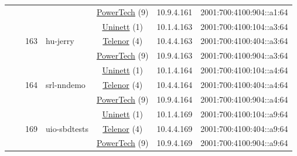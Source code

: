 \begin{small}
\begin{center}
\begin{longtable}{|c|c|c|c|c|c|c|c|}
  &  &  &  & \multicolumn{2}{|c|}{\tiny{\href{http://www.powertech.no}{PowerTech} (9)}} & \tiny{10.9.4.161} & \tiny{2001:700:4100:904::a1:64} \\* \cline{3-3}\cline{4-4}\cline{5-5}\cline{6-6}\cline{7-7}\cline{8-8}
  &  & \multirow{3}{*}{\tiny{163}} & \multicolumn{1}{|l|}{\multirow{3}{*}{\tiny{hu-jerry}}} & \multicolumn{2}{|c|}{\tiny{\href{https://www.uninett.no}{Uninett} (1)}} & \tiny{10.1.4.163} & \tiny{2001:700:4100:104::a3:64} \\* \cline{5-5}\cline{6-6}\cline{7-7}\cline{8-8}
  &  &  &  & \multicolumn{2}{|c|}{\tiny{\href{https://www.telenor.no}{Telenor} (4)}} & \tiny{10.4.4.163} & \tiny{2001:700:4100:404::a3:64} \\* \cline{5-5}\cline{6-6}\cline{7-7}\cline{8-8}
  &  &  &  & \multicolumn{2}{|c|}{\tiny{\href{http://www.powertech.no}{PowerTech} (9)}} & \tiny{10.9.4.163} & \tiny{2001:700:4100:904::a3:64} \\* \cline{3-3}\cline{4-4}\cline{5-5}\cline{6-6}\cline{7-7}\cline{8-8}
  &  & \multirow{3}{*}{\tiny{164}} & \multicolumn{1}{|l|}{\multirow{3}{*}{\tiny{srl-nndemo}}} & \multicolumn{2}{|c|}{\tiny{\href{https://www.uninett.no}{Uninett} (1)}} & \tiny{10.1.4.164} & \tiny{2001:700:4100:104::a4:64} \\* \cline{5-5}\cline{6-6}\cline{7-7}\cline{8-8}
  &  &  &  & \multicolumn{2}{|c|}{\tiny{\href{https://www.telenor.no}{Telenor} (4)}} & \tiny{10.4.4.164} & \tiny{2001:700:4100:404::a4:64} \\* \cline{5-5}\cline{6-6}\cline{7-7}\cline{8-8}
  &  &  &  & \multicolumn{2}{|c|}{\tiny{\href{http://www.powertech.no}{PowerTech} (9)}} & \tiny{10.9.4.164} & \tiny{2001:700:4100:904::a4:64} \\* \cline{3-3}\cline{4-4}\cline{5-5}\cline{6-6}\cline{7-7}\cline{8-8}
  &  & \multirow{3}{*}{\tiny{169}} & \multicolumn{1}{|l|}{\multirow{3}{*}{\tiny{uio-sbdtests}}} & \multicolumn{2}{|c|}{\tiny{\href{https://www.uninett.no}{Uninett} (1)}} & \tiny{10.1.4.169} & \tiny{2001:700:4100:104::a9:64} \\* \cline{5-5}\cline{6-6}\cline{7-7}\cline{8-8}
  &  &  &  & \multicolumn{2}{|c|}{\tiny{\href{https://www.telenor.no}{Telenor} (4)}} & \tiny{10.4.4.169} & \tiny{2001:700:4100:404::a9:64} \\* \cline{5-5}\cline{6-6}\cline{7-7}\cline{8-8}
  &  &  &  & \multicolumn{2}{|c|}{\tiny{\href{http://www.powertech.no}{PowerTech} (9)}} & \tiny{10.9.4.169} & \tiny{2001:700:4100:904::a9:64} \\* \cline{3-3}\cline{4-4}\cline{5-5}\cline{6-6}\cline{7-7}\cline{8-8}

\end{longtable}
\end{center}
\end{small}
